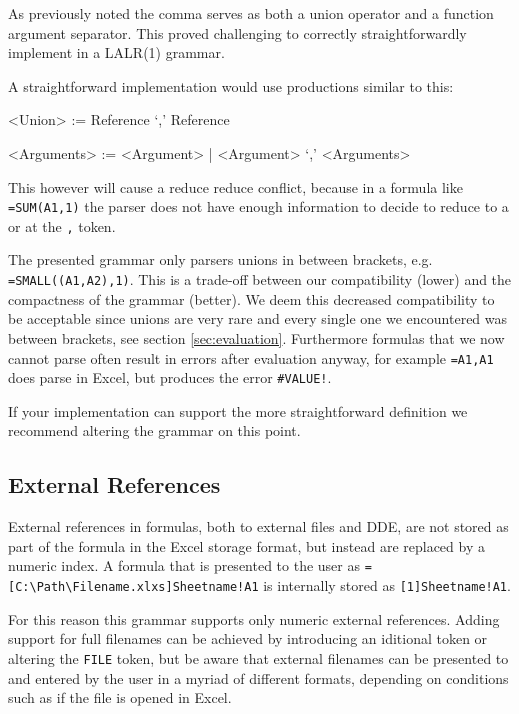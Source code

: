 \documentclass[conference]{IEEEtran}
\begin{document}
As previously noted the comma serves as both a union operator and a function argument separator.
This proved challenging to correctly straightforwardly implement in a LALR(1) grammar.

A straightforward implementation would use productions similar to this:

\begin{grammar}
<Union> := Reference `,' Reference

<Arguments> := <Argument> | <Argument> `,' <Arguments>
\end{grammar}

This however will cause a reduce reduce conflict, because in a formula like \texttt{=SUM(A1,1)} the parser does not have enough information to decide to reduce to a  or  at the \texttt{,} token.

The presented grammar only parsers unions in between brackets, e.g. \texttt{=SMALL((A1,A2),1)}.
This is a trade-off between our compatibility (lower) and the compactness of the grammar (better).
We deem this decreased compatibility to be acceptable since unions are very rare and every single one we encountered was between brackets, see section \ref{sec:evaluation}.
Furthermore formulas that we now cannot parse often result in errors after evaluation anyway, for example \texttt{=A1,A1} does parse in Excel, but produces the error \texttt{\#VALUE!}.

If your implementation can support the more straightforward definition we recommend altering the grammar on this point.

\subsection{External References}

External references in formulas, both to external files and DDE, are not stored as part of the formula in the Excel storage format, but instead are replaced by a numeric index.
A formula that is presented to the user as \texttt{=[C:\textbackslash Path\textbackslash Filename.xlxs]Sheetname!A1} is internally stored as \texttt{[1]Sheetname!A1}.

For this reason this grammar supports only numeric external references.
Adding support for full filenames can be achieved by introducing an iditional token or altering the \texttt{FILE} token, but be aware that external filenames can be presented to and entered by the user in a myriad of different formats, depending on conditions such as if the file is opened in Excel.
\end{document}
